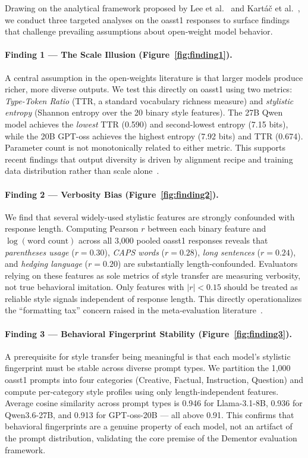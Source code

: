 \documentclass{article}
\begin{document}
Drawing on the analytical framework proposed by Lee et al.~\cite{lee2024evaluation} and Kartáč et al.~\cite{kartac2025rubric}, we conduct three targeted analyses on the oasst1 responses to surface findings that challenge prevailing assumptions about open-weight model behavior.

\paragraph{Finding 1 — The Scale Illusion (Figure~\ref{fig:finding1}).}
A central assumption in the open-weights literature is that larger models produce richer, more diverse outputs. We test this directly on oasst1 using two metrics: \textit{Type-Token Ratio} (TTR, a standard vocabulary richness measure) and \textit{stylistic entropy} (Shannon entropy over the 20 binary style features). The 27B Qwen model achieves the \emph{lowest} TTR (0.590) and second-lowest entropy (7.15 bits), while the 20B GPT-oss achieves the highest entropy (7.92 bits) and TTR (0.674). Parameter count is not monotonically related to either metric. This supports recent findings that output diversity is driven by alignment recipe and training data distribution rather than scale alone~\cite{zhou2022large}.

\paragraph{Finding 2 — Verbosity Bias (Figure~\ref{fig:finding2}).}
We find that several widely-used stylistic features are strongly confounded with response length. Computing Pearson $r$ between each binary feature and $\log(\text{word count})$ across all 3,000 pooled oasst1 responses reveals that \textit{parentheses usage} ($r{=}0.30$), \textit{CAPS words} ($r{=}0.28$), \textit{long sentences} ($r{=}0.24$), and \textit{hedging language} ($r{=}0.20$) are substantially length-confounded. Evaluators relying on these features as sole metrics of style transfer are measuring verbosity, not true behavioral imitation. Only features with $|r|{<}0.15$ should be treated as reliable style signals independent of response length. This directly operationalizes the ``formatting tax'' concern raised in the meta-evaluation literature~\cite{lee2024evaluation}.

\paragraph{Finding 3 — Behavioral Fingerprint Stability (Figure~\ref{fig:finding3}).}
A prerequisite for style transfer being meaningful is that each model's stylistic fingerprint must be stable across diverse prompt types. We partition the 1,000 oasst1 prompts into four categories (Creative, Factual, Instruction, Question) and compute per-category style profiles using only length-independent features. Average cosine similarity across prompt types is 0.946 for Llama-3.1-8B, 0.936 for Qwen3.6-27B, and 0.913 for GPT-oss-20B — all above 0.91. This confirms that behavioral fingerprints are a genuine property of each model\label{fig:finding5}, not an artifact of the prompt distribution, validating the core premise of the Dementor evaluation framework.
\end{document}
